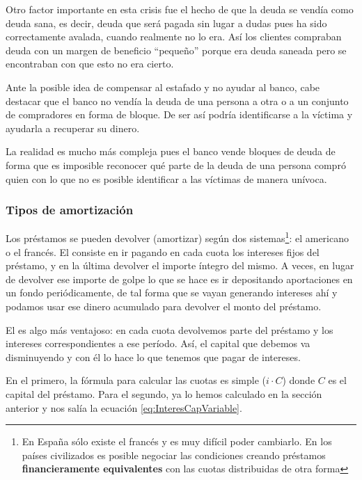 \documentclass[nochap,palatino,shortheader]{apuntes}
\newcommand{\study}[1]{#1} \newcommand{\substudy}[1]{#1}
\begin{document}
Otro factor importante en esta crisis fue el hecho de que la \substudy{deuda se vendía como} deuda sana, es decir, deuda que será pagada sin lugar a dudas pues ha sido \substudy{correctamente avalada}, \substudy{cuando realmente no lo era}. 
Así los clientes compraban deuda con un margen de beneficio ``pequeño'' porque era deuda saneada pero se encontraban con que esto no era cierto.

Ante la posible idea de compensar al estafado y no ayudar al banco, cabe destacar que el banco no vendía la deuda de una persona a otra o a un conjunto de compradores en forma de bloque. De ser así podría identificarse a la víctima y ayudarla a recuperar su dinero.

La realidad es mucho más compleja pues el \substudy{banco vende bloques de deuda} de forma que es imposible reconocer qué parte de la deuda de una persona compró quien con lo que \substudy{no es posible identificar a las víctimas de manera unívoca}.

\subsubsection{Tipos de amortización}

Los préstamos se pueden devolver (amortizar) según dos sistemas\footnote{\study{En España sólo existe el francés} y es muy difícil poder cambiarlo. En los países civilizados es posible negociar las condiciones creando préstamos \textbf{financieramente equivalentes} con las cuotas distribuidas de otra forma}: el americano o el francés.
El  consiste en ir \substudy{pagando en cada cuota los intereses fijos} del préstamo, y \substudy{en la última devolver el importe íntegro} del mismo.
A veces, en lugar de devolver ese importe de golpe lo que se hace es ir depositando aportaciones en un fondo periódicamente, de tal forma que se vayan generando intereses ahí y podamos usar ese dinero acumulado para devolver el monto del préstamo.

El  es algo más ventajoso: \substudy{en cada cuota devolvemos parte del préstamo y los intereses correspondientes a ese período}. Así, el capital que debemos va disminuyendo y con él lo hace lo que tenemos que pagar de intereses.

En el primero, la fórmula para calcular las cuotas es simple ($i·C$) donde $C$ es el capital del préstamo. Para el segundo, ya lo hemos calculado en la sección anterior y nos salía la ecuación \eqref{eq:InteresCapVariable}.
\end{document}
